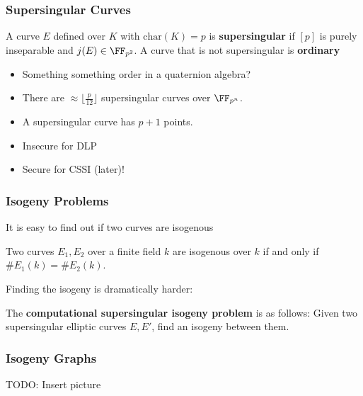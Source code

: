\documentclass{beamer}
\begin{document}
\begin{frame}
    \frametitle{Supersingular Curves}
    \begin{definition}
        A curve $E$ defined over $K$ with $\mathrm{char}(K) = p$ is \textbf{supersingular}
        if $[p]$ is purely inseparable and $j(E) \in \FF_{p^2}$. 
        A curve that is not supersingular is \textbf{ordinary}
    \end{definition}
    \begin{itemize}
        \item Something something order in a quaternion algebra?
        \item There are $\approx \lfloor \frac{p}{12} \rfloor$ supersingular curves over $\FF_{p^n}$.
        \item A supersingular curve has $p + 1$ points.
        \item Insecure for DLP
        \item Secure for CSSI (later)!
    \end{itemize}
    

\end{frame}

\begin{frame}
    \frametitle{Isogeny Problems}
    It is easy to find out if two curves are isogenous
    \begin{theorem}
        Two curves $E_1, E_2$ over a finite field $k$ are isogenous over $k$ if and only if $\#E_1(k) = \#E_2(k)$.
    \end{theorem}
   Finding the isogeny is dramatically harder:
   \begin{definition}
       The \textbf{computational supersingular isogeny problem} is as follows:
       Given two supersingular elliptic curves $E, E'$, find an isogeny between them. 
   \end{definition}
\end{frame}

\begin{frame}
    \frametitle{Isogeny Graphs}
    TODO: Insert picture
\end{frame}
\end{document}

